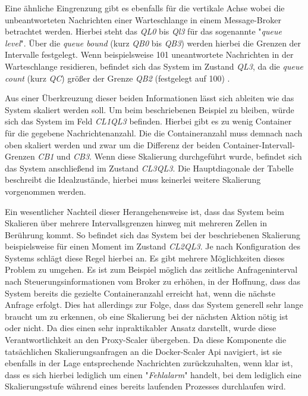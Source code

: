 Eine ähnliche Eingrenzung gibt es ebenfalls für die vertikale Achse wobei die unbeantworteten Nachrichten einer Warteschlange in einem Message-Broker betrachtet werden. Hierbei steht das \emph{QL0} bis \emph{Ql3} für das sogenannte "\emph{queue level}". Über die \emph{queue bound} (kurz \emph{QB0} bis \emph{QB3}) werden hierbei die Grenzen der Intervalle festgelegt. Wenn beispielsweise 101 uneantwortete Nachrichten in der Warteschlange residieren, befindet sich das System im Zustand \emph{QL3}, da die \emph{queue count} (kurz \emph{QC}) größer der Grenze \emph{QB2} (festgelegt auf 100) .

Aus einer Überkreuzung dieser beiden Informationen lässt sich ableiten wie das System skaliert werden soll. Um beim beschriebenen Beispiel zu bleiben, würde sich das System im Feld \emph{CL1QL3} befinden. Hierbei gibt es zu wenig Container für die gegebene Nachrichtenanzahl. Die die Containeranzahl muss demnach nach oben skaliert werden und zwar um die Differenz der beiden Container-Intervall-Grenzen \emph{CB1} und \emph{CB3}. Wenn diese Skalierung durchgeführt wurde, befindet sich das System anschließend im Zustand \emph{CL3QL3}. Die Hauptdiagonale der Tabelle beschreibt die Idealzustände, hierbei muss keinerlei weitere Skalierung vorgenommen werden. 

\label{prometheus:skalierungsmechanismus}
Ein wesentlicher Nachteil dieser Herangehensweise ist, dass das System beim Skalieren über mehrere Intervallsgrenzen hinweg mit mehreren Zellen in Berührung kommt. So befindet sich das System bei der beschriebenen Skalierung beispielsweise für einen Moment im Zustand \emph{CL2QL3}. Je nach Konfiguration des Systems schlägt diese Regel hierbei an. Es gibt mehrere Möglichkeiten dieses Problem zu umgehen. Es ist zum Beispiel möglich das zeitliche Anfrageninterval nach Steuerungsinformationen vom Broker zu erhöhen, in der Hoffnung, dass das System bereits die gezielte Containeranzahl erreicht hat, wenn die nächste Anfrage erfolgt. Dies hat allerdings zur Folge, dass das System generell sehr lange braucht um zu erkennen, ob eine Skalierung bei der nächsten Aktion nötig ist oder nicht. Da dies einen sehr inpraktikabler Ansatz darstellt, wurde diese Verantwortlichkeit an den Proxy-Scaler übergeben. Da diese Komponente die tatsächlichen Skalierungsanfragen an die Docker-Scaler Api navigiert, ist sie ebenfalls in der Lage entsprechende Nachrichten zurückzuhalten, wenn klar ist, dass es sich hierbei lediglich um einen "\emph{Fehlalarm}" handelt, bei dem lediglich eine Skalierungsstufe während eines bereits laufenden Prozesses durchlaufen wird. 


